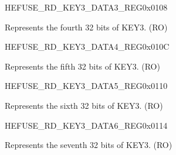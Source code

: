 \begin{register}{H}{EFUSE\_RD\_KEY3\_DATA3\_REG}{0x{}0108}\label{regdesc:EFUSERDKEY3DATA3REG}
%
\regnewline%
\begin{regdesc}\begin{reglist}
\label{fielddesc:EFUSEKEY3DATA3}\item [EFUSE\_KEY3\_DATA3] Represents the fourth 32 bits of KEY3. (RO)
\end{reglist}\end{regdesc}
\end{register}


\begin{register}{H}{EFUSE\_RD\_KEY3\_DATA4\_REG}{0x{}010C}\label{regdesc:EFUSERDKEY3DATA4REG}
%
\regnewline%
\begin{regdesc}\begin{reglist}
\label{fielddesc:EFUSEKEY3DATA4}\item [EFUSE\_KEY3\_DATA4] Represents the fifth 32 bits of KEY3. (RO)
\end{reglist}\end{regdesc}
\end{register}


\begin{register}{H}{EFUSE\_RD\_KEY3\_DATA5\_REG}{0x{}0110}\label{regdesc:EFUSERDKEY3DATA5REG}
%
\regnewline%
\begin{regdesc}\begin{reglist}
\label{fielddesc:EFUSEKEY3DATA5}\item [EFUSE\_KEY3\_DATA5] Represents the sixth 32 bits of KEY3. (RO)
\end{reglist}\end{regdesc}
\end{register}


\begin{register}{H}{EFUSE\_RD\_KEY3\_DATA6\_REG}{0x{}0114}\label{regdesc:EFUSERDKEY3DATA6REG}
%
\regnewline%
\begin{regdesc}\begin{reglist}
\label{fielddesc:EFUSEKEY3DATA6}\item [EFUSE\_KEY3\_DATA6] Represents the seventh 32 bits of KEY3. (RO)
\end{reglist}\end{regdesc}
\end{register}


